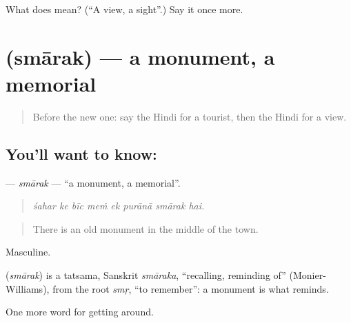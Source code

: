\begin{tcolorbox}[breakable,colback=teal!4,colframe=teal!35!black,title={Before you move on}]
What does  mean? (\textquotedblleft{}A view, a sight\textquotedblright{}.) Say it once more.
\end{tcolorbox}
\section[\texorpdfstring{\hi{स्मारक} (smārak)}{स्मारक (smārak)}]{ (smārak) — a monument, a memorial}

\label{lesson:HI-C451-smarak}



\begin{quote}
Before the new one: say the Hindi for a tourist, then the Hindi for a view.
\end{quote}

\subsection*{You'll want to know: }
\textbf{} — \emph{smārak} — \textquotedblleft{}a monument, a memorial\textquotedblright{}.

\begin{quote}
       
\end{quote}

\begin{quote}
\emph{śahar ke bīc meṁ ek purānā smārak hai.}
\end{quote}

\begin{quote}
There is an old monument in the middle of the town.
\end{quote}

Masculine.

\begin{cousinweb}
\textbf{} (\emph{smārak}) is a tatsama, Sanskrit \emph{smāraka}, \textquotedblleft{}recalling, reminding of\textquotedblright{} (Monier-Williams), from the root \emph{smṛ}, \textquotedblleft{}to remember\textquotedblright{}: a monument is what reminds.
\end{cousinweb}

\begin{grammarlens}[title={What you've built}]
One more word for getting around.
\end{grammarlens}

